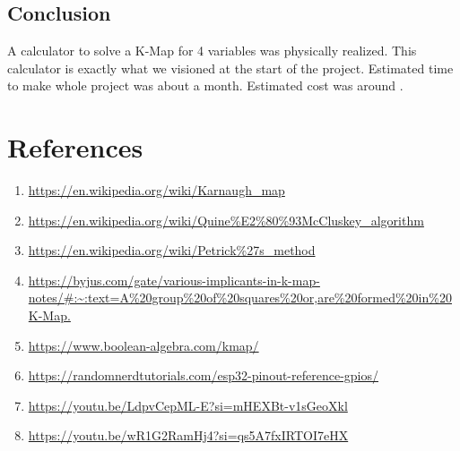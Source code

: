 \documentclass[12pt,a4paper]{article}
\begin{document}
\subsection{Conclusion}
A calculator to solve a K-Map for 4 variables was physically realized. This calculator is exactly what we visioned at the start of the project. Estimated time to make whole project was about a month. Estimated cost was around   .
\newpage
\section{References}
\begin{enumerate}
    \item \url{https://en.wikipedia.org/wiki/Karnaugh_map}
    \item \url{https://en.wikipedia.org/wiki/Quine%E2%80%93McCluskey_algorithm}
    \item \url{https://en.wikipedia.org/wiki/Petrick%27s_method}
    \item \url{https://byjus.com/gate/various-implicants-in-k-map-notes/#:~:text=A%20group%20of%20squares%20or,are%20formed%20in%20K-Map.}
    \item \url{https://www.boolean-algebra.com/kmap/}
    \item \url{https://randomnerdtutorials.com/esp32-pinout-reference-gpios/}
    \item \url{https://youtu.be/LdpvCepML-E?si=mHEXBt-v1sGeoXkl}
    \item \url{https://youtu.be/wR1G2RamHj4?si=qs5A7fxIRTOI7eHX}
\end{enumerate}
\end{document}
